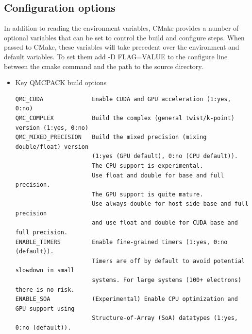 \subsection{Configuration options}
\label{sec:cmakeoptions}
In addition to reading the environment variables, CMake provides a
number of optional variables that can be set to control the build and
configure steps.  When passed to CMake, these variables will take
precedent over the environment and default variables.  To set them
add -D FLAG=VALUE to the configure line between the cmake command and
the path to the source directory.

\begin{itemize}
\item  Key QMCPACK build options
\verbatimfont{\footnotesize}%
\begin{verbatim}
QMC_CUDA              Enable CUDA and GPU acceleration (1:yes, 0:no)
QMC_COMPLEX           Build the complex (general twist/k-point) version (1:yes, 0:no)
QMC_MIXED_PRECISION   Build the mixed precision (mixing double/float) version
                      (1:yes (GPU default), 0:no (CPU default)).
                      The CPU support is experimental.
                      Use float and double for base and full precision.
                      The GPU support is quite mature.
                      Use always double for host side base and full precision
                      and use float and double for CUDA base and full precision.
ENABLE_TIMERS         Enable fine-grained timers (1:yes, 0:no (default)).
                      Timers are off by default to avoid potential slowdown in small
                      systems. For large systems (100+ electrons) there is no risk.
ENABLE_SOA            (Experimental) Enable CPU optimization and GPU support using
                      Structure-of-Array (SoA) datatypes (1:yes, 0:no (default)).
\end{verbatim}


\end{itemize}
